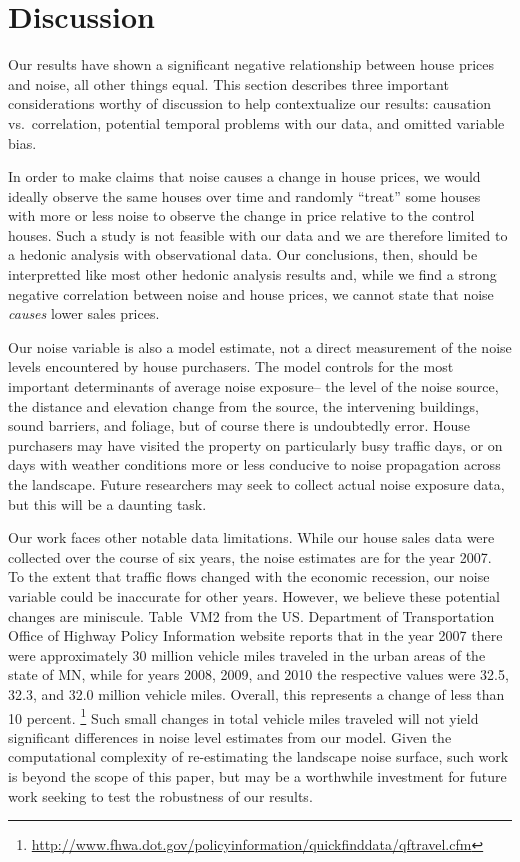 \documentclass{article}\usepackage{graphicx, color}
\begin{document}
\section{Discussion}\label{Discussion}

Our results have shown a significant negative relationship between house prices and noise, all other things equal. This section describes three important considerations worthy of discussion to help contextualize our results: causation vs.\ correlation, potential temporal problems with our data, and omitted variable bias.

In order to make claims that noise causes a change in house prices, we would ideally observe the same houses over time and randomly ``treat'' some houses with more or less noise to observe the change in price relative to the control houses. Such a study is not feasible with our data and we are therefore limited to a hedonic analysis with observational data. Our conclusions, then, should be interpretted like most other hedonic analysis results and, while we find a strong negative correlation between noise and house prices, we cannot state that noise \emph{causes} lower sales prices. 

Our noise variable is also a model estimate, not a direct measurement of the noise levels encountered by house purchasers. The model controls for the most important determinants of average noise exposure-- the level of the noise source, the distance and elevation change from the source, the intervening buildings, sound barriers, and foliage, but of course there is undoubtedly error. House purchasers may have visited the property on particularly busy traffic days, or on days with weather conditions more or less conducive to noise propagation across the landscape. Future researchers may seek to collect actual noise exposure data, but this will be a daunting task. 

Our work faces other notable data limitations. While our house sales data were collected over the course of six years, the noise estimates are for the year 2007. To the extent that traffic flows changed with the economic recession, our noise variable could be inaccurate for other years. However, we believe these potential changes are miniscule. Table~VM2 from the US. Department of Transportation Office of Highway Policy Information website reports that in the year 2007 there were approximately 30 million vehicle miles traveled in the urban areas of the state of MN, while for years 2008, 2009, and 2010 the respective values were 32.5, 32.3, and 32.0 million vehicle miles. Overall, this represents a change of less than 10 percent. \footnote{\url{http://www.fhwa.dot.gov/policyinformation/quickfinddata/qftravel.cfm}} Such small changes in total vehicle miles traveled will not yield significant differences in noise level estimates from our model. Given the computational complexity of re-estimating the landscape noise surface, such work is beyond the scope of this paper, but may be a worthwhile investment for future work seeking to test the robustness of our results.
\end{document}
